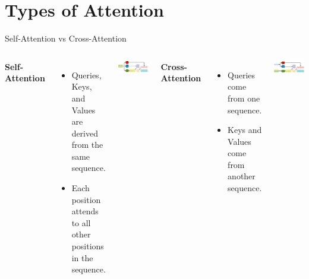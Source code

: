 \documentclass[serif, aspectratio=169]{beamer}
\begin{document}
\section{Types of Attention}
\begin{frame}{Self-Attention vs Cross-Attention}
	\begin{columns}
		\textbf{Self-Attention}
		\begin{itemize}
			\item Queries, Keys, and Values are derived from the same sequence.
			\item Each position attends to all other positions in the sequence.
		\end{itemize}
		\vspace{0.5em}
		\includegraphics[width=\textwidth]{pic/self-attention.png}
		
		\textbf{Cross-Attention}
		\begin{itemize}
			\item Queries come from one sequence.
			\item Keys and Values come from another sequence.
		\end{itemize}
		\vspace{0.5em}
		\includegraphics[width=\textwidth]{pic/cross-attention.png}
	\end{columns}
\end{frame}
\end{document}
